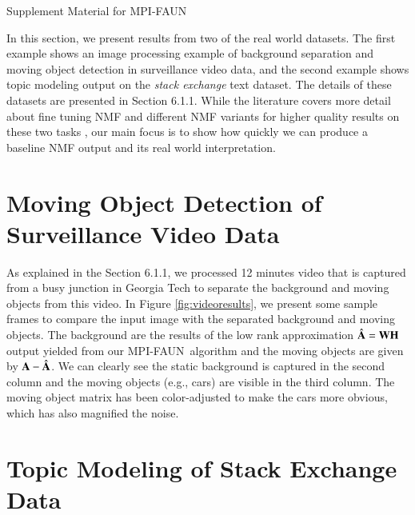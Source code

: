 \documentclass[10pt,journal,compsoc, onecolumn]{IEEEtran}
\newcommand{\ParNMF}{MPI-FAUN}
\begin{document}
\begin{center}
\huge
Supplement Material for MPI-FAUN
\end{center}

In this section, we present results from two of the real world datasets. 
The first example shows an image processing example of background separation and moving object detection in surveillance video data, and the second example shows topic modeling output on the \emph{stack exchange} text dataset. The details of these datasets are presented in Section 6.1.1. 
While the literature covers more detail about fine tuning NMF and different NMF variants for higher quality results on these two tasks  \cite{ZT2011,B2014,AGHKT2014,KJJCH2015}, our main focus is to show how quickly we can produce a baseline NMF output and its real world interpretation. 

\section{Moving Object Detection of Surveillance Video Data}

As explained in the Section 6.1.1, we processed 12 minutes video that is captured from a 
busy junction in Georgia Tech to separate the background and moving objects from this video. 
In Figure \ref{fig:videoresults}, we present some sample frames to compare the input image with the separated background and moving objects.
The background are the results of the low rank approximation 
$\hat{\AA}=\WW\HH$ output yielded from our \ParNMF\ algorithm and the moving objects are given by $\AA-\hat{\AA}$. 
We can clearly see the static background is captured in the second column and the moving objects (e.g., cars) are visible in the third column. 
The moving object matrix has been color-adjusted to make the cars more obvious, which has also magnified the noise.

\section{Topic Modeling of Stack Exchange Data}
\end{document}
